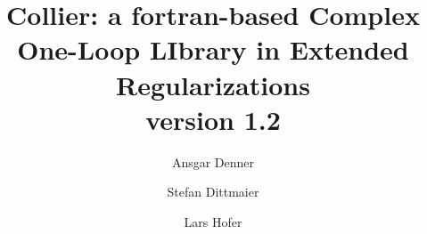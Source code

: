 \documentclass[preprint,sort&compress,12pt]{elsarticle}
\newcommand{\collier}{{\sc Collier}}
\begin{document}
\begin{frontmatter}



\title{\collier: {a fortran-based  Complex One-Loop LIbrary in
  Extended Regularizations}\\
  version 1.2}


\author[ad]{Ansgar Denner}

\author[sd]{Stefan Dittmaier}

\author[lh]{Lars Hofer}


\address[ad]{Universit\"at W\"urzburg, 
Institut f\"ur Theoretische Physik und Astrophysik, \\
D-97074 W\"urzburg, Germany}
\address[sd]{Albert-Ludwigs-Universit\"at Freiburg, Physikalisches Institut, 
\\ D-79104 Freiburg, Germany}
\address[lh]{Department de F\'isica Qu\`antica i Astrof\'isica (FQA), \\
Institut de Ci\`encies del Cosmos (ICCUB), \\
Universitat de Barcelona (UB),
Mart\'i Franqu\`es 1, \\
E-08028 Barcelona, Spain}


\end{frontmatter}
\end{document}
